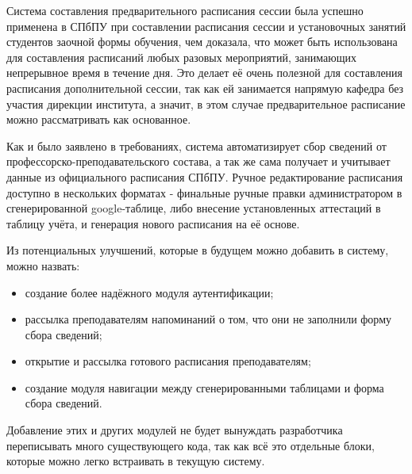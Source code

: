 Система составления предварительного расписания сессии была успешно применена в СПбПУ при составлении расписания сессии и установочных занятий студентов заочной формы обучения, чем доказала, что может быть использована для составления расписаний любых разовых мероприятий, занимающих непрерывное время в течение дня. Это делает её очень полезной для составления расписания дополнительной сессии, так как ей занимается напрямую кафедра без участия дирекции института, а значит, в этом случае предварительное расписание можно рассматривать как основанное.

Как и было заявлено в требованиях, система автоматизирует сбор сведений от профессорско-преподавательского состава, а так же сама получает и учитывает данные из официального расписания СПбПУ. Ручное редактирование расписания доступно в нескольких форматах - финальные ручные правки администратором в сгенерированной google-таблице, либо внесение установленных аттестаций в таблицу учёта, и генерация нового расписания на её основе.

Из потенциальных улучшений, которые в будущем можно добавить в систему, можно назвать:
\begin{itemize}
	\item создание более надёжного модуля аутентификации;
	\item рассылка преподавателям напоминаний о том, что они не заполнили форму сбора сведений;
	\item открытие и рассылка готового расписания преподавателям;
	\item создание модуля навигации между сгенерированными таблицами и форма сбора сведений.
\end{itemize} 	

Добавление этих и других модулей не будет вынуждать разработчика переписывать много существующего кода, так как всё это отдельные блоки, которые можно легко встраивать в текущую систему.